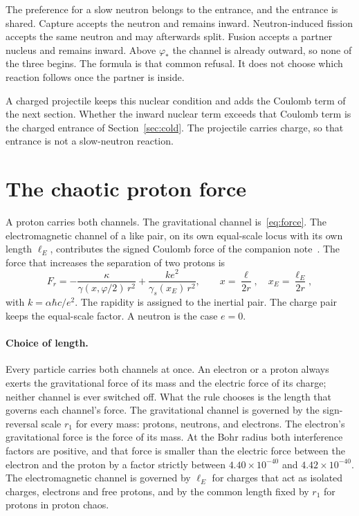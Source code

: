 \documentclass[a4paper]{article}
\begin{document}
The preference for a slow neutron belongs to the entrance, and the entrance is shared. Capture accepts the neutron and remains inward. Neutron-induced fission accepts the same neutron and may afterwards split. Fusion accepts a partner nucleus and remains inward. Above \(\varphi_*\) the channel is already outward, so none of the three begins. The formula is that common refusal. It does not choose which reaction follows once the partner is inside.

A charged projectile keeps this nuclear condition and adds the Coulomb term of the next section. Whether the inward nuclear term exceeds that Coulomb term is the charged entrance of Section~\ref{sec:cold}. The projectile carries charge, so that entrance is not a slow-neutron reaction.

\section{The chaotic proton force}
\label{sec:proton}

A proton carries both channels. The gravitational channel is~\eqref{eq:force}. The electromagnetic channel of a like pair, on its own equal-scale locus with its own length \(\ell_E\), contributes the signed Coulomb force of the companion note~\cite{dst-shell}. The force that increases the separation of two protons is
\begin{equation}
\label{eq:two-channel}
F_r
  =-\frac{\kappa}{\gamma(x,\varphi/2)\,r^{2}}
  +\frac{k e^{2}}{\gamma_s(x_E)\,r^{2}},
\qquad
x=\frac{\ell}{2r},
\quad
x_E=\frac{\ell_E}{2r},
\end{equation}
with \(k=\alpha\hbar c/e^{2}\). The rapidity is assigned to the inertial pair. The charge pair keeps the equal-scale factor. A neutron is the case \(e=0\).

\paragraph{Choice of length.}\label{rule:length}
Every particle carries both channels at once. An electron or a proton always exerts the gravitational force of its mass and the electric force of its charge; neither channel is ever switched off. What the rule chooses is the length that governs each channel's force. The gravitational channel is governed by the sign-reversal scale \(r_1\) for every mass: protons, neutrons, and electrons. The electron's gravitational force is the force of its mass. At the Bohr radius both interference factors are positive, and that force is smaller than the electric force between the electron and the proton by a factor strictly between \(4.40\times 10^{-40}\) and \(4.42\times 10^{-40}\). The electromagnetic channel is governed by \(\ell_E\) for charges that act as isolated charges, electrons and free protons, and by the common length fixed by \(r_1\) for protons in proton chaos.
\end{document}
